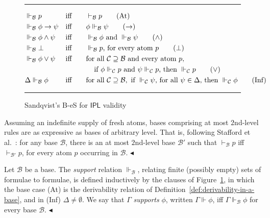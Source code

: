 \documentclass{lipics-v2021}
\newcommand{\fillBox}{\hfill$\blacktriangleleft$}
\newcommand{\deriv}[1]{\vdash_{#1}}       %
\newcommand{\supp}[1]{\Vdash_{#1}}
\newcommand{\base}[1]{\mathcal{#1}}                    %
\newcommand{\IPL}{\textsf{IPL}}
\begin{document}
\begin{figure}[t]
    \hrule
    \begin{align}
        &\supp{\base{B}} p
            &&\text{iff} \qquad\deriv{\base{B}} p
            \tag{At} \\
        &\supp{\base{B}} \phi \to \psi
            &&\text{iff} \qquad\phi \supp{\base{B}} \psi
            \tag{$\to$} \\
        &\supp{\base{B}} \phi \land \psi
            &&\text{iff} \qquad\supp{\base{B}} \phi \text{ and } \supp{\base{B}} \psi
            \tag{$\land$} \\
        &\supp{\base{B}} \bot
            &&\text{iff} \qquad\supp{\base{B}} p \text{, for every atom } p
            \tag{$\bot$} \\
        &\supp{\base{B}} \phi \lor \psi
            &&\text{iff} \qquad\text{for all } \base{C} \supseteq \base{B} \text{ and every atom } p, \notag \\
            & && \qquad \qquad\text{if } \phi \supp{\base{C}} p \text{ and } \psi \supp{\base{C}} p \text{, then } \supp{\base{C}} p
            \tag{$\lor$} \\
        &\Delta \supp{\base{B}} \phi
            &&\text{iff} \qquad \text{for all } \base{C} \supseteq \base{B},\ \text{if } \supp{\base{C}} \psi \text{, for all } \psi \in \Delta \text{, then } \supp{\base{C}} \phi
            \tag{Inf}
    \end{align}
     \caption{Sandqvist's B-eS for $\IPL$ validity \cite{Sandqvist_Tor}}\vspace{1mm}
    \hrule
    \label{fig:sandqvist-ipl}
\end{figure}
\begin{remark}[Restriction]
\label{rem:restriction}
Assuming an indefinite supply of fresh atoms, bases comprising at most
$2$nd-level rules are as expressive as bases of arbitrary level. That is,
following Stafford et al.~\cite{Stafford2026-STALOP-5}: for any base $\base{B}$, there is an at
most $2$nd-level base $\base{B}'$ such that
$\deriv{\base{B}} p$ iff  $\deriv{\base{B}'} p$,
for every atom $p$ occurring in $\base{B}$. \fillBox
\end{remark}

\begin{definition}
\label{def:support}
Let $\base{B}$ be a base. The \emph{support} relation $\supp{\base{B}}$,
relating finite (possibly empty) sets of formulae to formulae, is defined
inductively by the clauses of Figure~\ref{fig:sandqvist-ipl}, in which the base
case (At) is the derivability relation of
Definition~\ref{def:derivability-in-a-base}, and in (Inf) $\Delta \neq \emptyset$. We say that $\Gamma$
\emph{supports} $\phi$, written $\Gamma \Vdash \phi$, iff
$\Gamma \supp{\base{B}} \phi$ for every base $\base{B}$. \fillBox
\end{definition}
\end{document}
